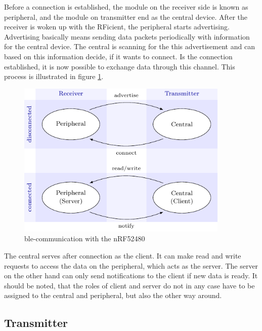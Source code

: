 Before a connection is established, the module on the receiver side is known as peripheral, and the module on transmitter end as the central device.
After the receiver is woken up with the RFicient, the peripheral starts advertising.
Advertising basically means sending data packets periodically with information for the central device.
The central is scanning for the this advertisement and can based on this information decide, if it wants to connect.
Is the connection established, it is now possible to exchange data through this channel.
This process is illustrated in figure \ref{software:ble}.
\begin{figure}[ht]
	\centering
	\includegraphics[width=0.9\textwidth]{4-development/software/graphics/ble.pdf}
	\caption{\acs{ble}-communication with the nRF52480\label{software:ble}}
\end{figure}

The central serves after connection as the client.
It can make read and write requests to access the data on the peripheral, which acts as the server.
The server on the other hand can only send notifications to the client if new data is ready.
It should be noted, that the roles of client and server do not in any case have to be assigned to the central and peripheral, but also the other way around. 

\subsection{Transmitter}